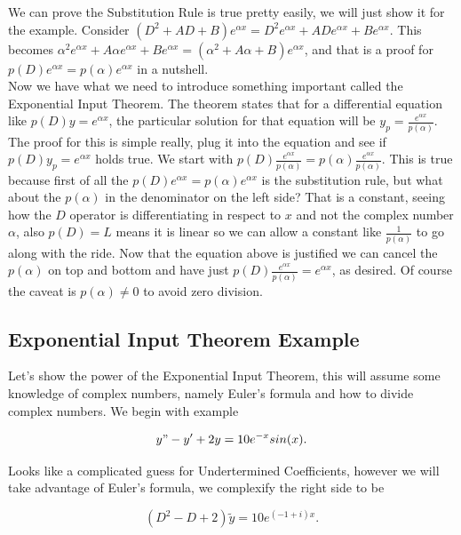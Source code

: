 \documentclass[12pt]{article}
\begin{document}
We can prove the Substitution Rule is true pretty easily, we will just show it for the example. Consider $(D^2+AD+B)e^{\alpha x}=D^2e^{\alpha x}+ADe^{\alpha x}+Be^{\alpha x}$. This becomes $\alpha^2e^{\alpha x}+A\alpha e^{\alpha x} + Be^{\alpha x}=(\alpha^2+A\alpha + B)e^{\alpha x}$, and that is a proof for $p(D)e^{\alpha x}=p(\alpha)e^{\alpha x}$ in a nutshell. \\

Now we have what we need to introduce something important called the Exponential Input Theorem. The theorem states that for a differential equation like $p(D)y = e^{\alpha x}$, the particular solution for that equation will be $y_p=\frac{e^{\alpha x}}{p(\alpha)}$. \\

The proof for this is simple really, plug it into the equation and see if $p(D)y_p = e^{\alpha x}$ holds true. We start with $p(D)\frac{e^{\alpha x}}{p(\alpha)} = p(\alpha)\frac{e^{\alpha x}}{p(\alpha)}$. This is true because first of all the $p(D)e^{\alpha x}=p(\alpha)e^{\alpha x}$ is the substitution rule, but what about the $p(\alpha)$ in the denominator on the left side? That is a constant, seeing how the $D$ operator is differentiating in respect to $x$ and not the complex number $\alpha$, also $p(D)=L$ means it is linear so we can allow a constant like $\frac{1}{p(\alpha)}$ to go along with the ride. Now that the equation above is justified we can cancel the $p(\alpha)$ on top and bottom and have just $p(D)\frac{e^{\alpha x}}{p(\alpha)} = e^{\alpha x}$, as desired. Of course the caveat is $p(\alpha) \neq 0$ to avoid zero division.

\subsection{Exponential Input Theorem Example}

Let's show the power of the Exponential Input Theorem, this will assume some knowledge of complex numbers, namely Euler's formula and how to divide complex numbers. We begin with example

\begin{equation*}
    y"-y'+2y=10e^{-x}sin(x).
\end{equation*}

Looks like a complicated guess for Undertermined Coefficients, however we will take advantage of Euler's formula, we complexify the right side to be

\begin{equation*}
    (D^2-D+2)\tilde{y}=10e^{(-1+i)x}.
\end{equation*}
\end{document}
